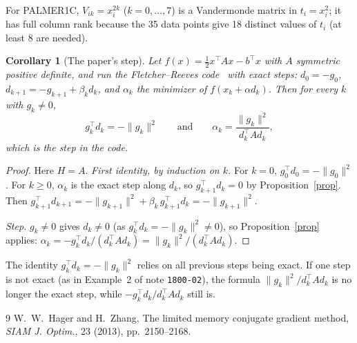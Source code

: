 \documentclass[11pt]{article}
\newtheorem{corollary}{Corollary}
\begin{document}
For PALMER1C, $V_{ik}=x_i^{2k}$ ($k=0,\dots,7$) is a Vandermonde matrix in
$t_i=x_i^2$; it has full column rank because the 35 data points give 18 distinct
values of $t_i$ (at least 8 are needed).

\begin{corollary}[The paper's step]\label{cor:paper}
Let $f(x)=\tfrac12x^{\top}Ax-b^{\top}x$ with $A$ symmetric positive definite,
and run the Fletcher--Reeves code~\cite[p.~2152]{HZ13} with exact steps:
$d_0=-g_0$, $d_{k+1}=-g_{k+1}+\beta_kd_k$, and $\alpha_k$ the minimizer of
$f(x_k+\alpha d_k)$. Then for every $k$ with $g_k\ne0$,
\[
g_k^{\top}d_k=-\|g_k\|^2\qquad\text{and}\qquad
\alpha_k=\frac{\|g_k\|^2}{d_k^{\top}Ad_k},
\]
which is the step in the code.
\end{corollary}

\begin{proof}
Here $H=A$. \emph{First identity, by induction on $k$.} For $k=0$,
$g_0^{\top}d_0=-\|g_0\|^2$. For $k\ge0$, $\alpha_k$ is the exact step along
$d_k$, so $g_{k+1}^{\top}d_k=0$ by Proposition~\ref{prop}. Then
$g_{k+1}^{\top}d_{k+1}=-\|g_{k+1}\|^2+\beta_k\,g_{k+1}^{\top}d_k=-\|g_{k+1}\|^2$.

\emph{Step.} $g_k\ne0$ gives $d_k\ne0$ (as $g_k^{\top}d_k=-\|g_k\|^2\ne0$), so
Proposition~\ref{prop} applies:
$\alpha_k=-g_k^{\top}d_k/(d_k^{\top}Ad_k)=\|g_k\|^2/(d_k^{\top}Ad_k)$.
\end{proof}

The identity $g_k^{\top}d_k=-\|g_k\|^2$ relies on all previous steps being
exact. If one step is not exact (as in Example~2 of note \texttt{1800-02}),
the formula $\|g_k\|^2/d_k^{\top}Ad_k$ is no longer the exact step, while
$-g_k^{\top}d_k/d_k^{\top}Ad_k$ still is.

\begin{thebibliography}{9}
 W.~W.~Hager and H.~Zhang, The limited memory conjugate gradient
method, \emph{SIAM J. Optim.}, 23 (2013), pp.~2150--2168.
\end{thebibliography}
\end{document}
